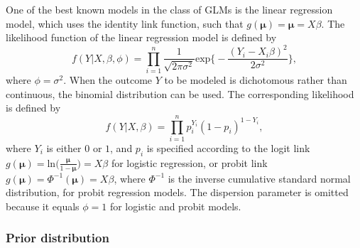 \documentclass[review, 3p, authoryear]{elsarticle} %
\begin{document}
One of the best known models in the class of GLMs is the linear regression model, which uses the identity link function, such that \(g(\boldsymbol{\mu}) = \boldsymbol{\mu} = X\beta\).
The likelihood function of the linear regression model is defined by
\[
f(Y | X, \beta, \phi) = \prod^n_{i=1} \frac{1}{\sqrt{2\pi\sigma^2}} \text{exp}
\Bigg\{
- \frac{(Y_i - X_i\beta)^2}{2\sigma^2}
\Bigg\},
\]
where \(\phi = \sigma^2\).
When the outcome \(Y\) to be modeled is dichotomous rather than continuous, the binomial distribution can be used.
The corresponding likelihood is defined by
\[
f(Y|X, \beta) = \prod^n_{i=1} p_i^{Y_i} (1 - p_i)^{1 - Y_i},
\]
where \(Y_i\) is either \(0\) or \(1\), and \(p_i\) is specified according to the logit link \(g(\boldsymbol{\mu}) = \text{ln}\Big(\frac{\boldsymbol{\mu}}{1 - \boldsymbol{\mu}}\Big) = X\beta\) for logistic regression, or probit link \(g(\boldsymbol{\mu}) = \Phi^{-1}(\boldsymbol{\mu}) = X\beta\), where \(\Phi^{-1}\) is the inverse cumulative standard normal distribution, for probit regression models.
The dispersion parameter is omitted because it equals \(\phi = 1\) for logistic and probit models.

\hypertarget{prior-distribution}{%
\subsubsection{Prior distribution}\label{prior-distribution}}
\end{document}
